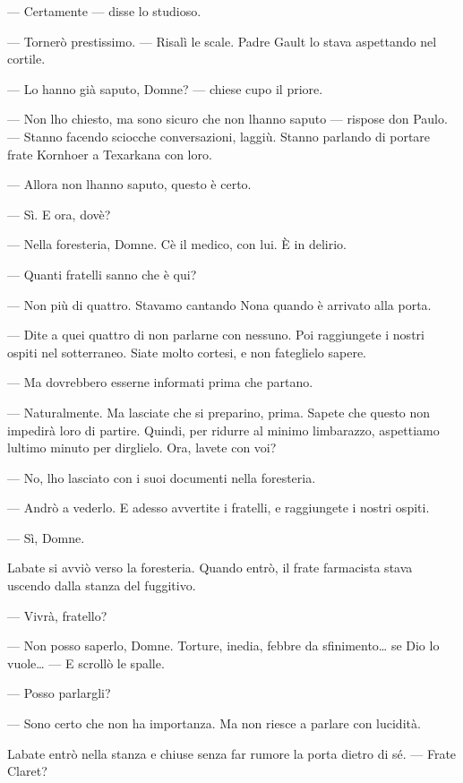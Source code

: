 --- Certamente --- disse lo studioso.

--- Tornerò prestissimo. --- Risalì le scale. Padre Gault lo stava
aspettando nel cortile.

--- Lo hanno già saputo, Domne? --- chiese cupo il priore.

--- Non l\textquotesingle ho chiesto, ma sono sicuro che non
l\textquotesingle hanno saputo --- rispose don Paulo. --- Stanno facendo
sciocche conversazioni, laggiù. Stanno parlando di portare frate
Kornhoer a Texarkana con loro.

--- Allora non l\textquotesingle hanno saputo, questo è certo.

--- Sì. E ora, dov\textquotesingle è?

--- Nella foresteria, Domne. C\textquotesingle è il medico, con lui. È
in delirio.

--- Quanti fratelli sanno che è qui?

--- Non più di quattro. Stavamo cantando Nona quando è arrivato alla
porta.

--- Dite a quei quattro di non parlarne con nessuno. Poi raggiungete i
nostri ospiti nel sotterraneo. Siate molto cortesi, e non fateglielo
sapere.

--- Ma dovrebbero esserne informati prima che partano.

--- Naturalmente. Ma lasciate che si preparino, prima. Sapete che questo
non impedirà loro di partire. Quindi, per ridurre al minimo
l\textquotesingle imbarazzo, aspettiamo l\textquotesingle ultimo minuto
per dirglielo. Ora, l\textquotesingle avete con voi?

--- No, l\textquotesingle ho lasciato con i suoi documenti nella
foresteria.

--- Andrò a vederlo. E adesso avvertite i fratelli, e raggiungete i
nostri ospiti.

--- Sì, Domne.

L\textquotesingle abate si avviò verso la foresteria. Quando entrò, il
frate farmacista stava uscendo dalla stanza del fuggitivo.

--- Vivrà, fratello?

--- Non posso saperlo, Domne. Torture, inedia, febbre da
sfinimento\ldots{} se Dio lo vuole\ldots{} --- E scrollò le spalle.

--- Posso parlargli?

--- Sono certo che non ha importanza. Ma non riesce a parlare con
lucidità.

L\textquotesingle abate entrò nella stanza e chiuse senza far rumore la
porta dietro di sé. --- Frate Claret?

